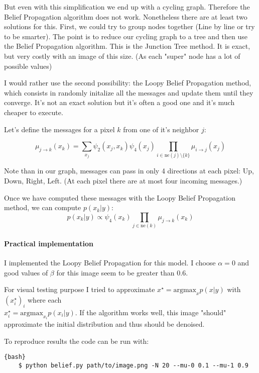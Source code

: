 \documentclass{article}
\begin{document}
But even with this simplification we end up with a cycling graph. Therefore the Belief Propagation algorithm does not work. Nonetheless there are at least
two solutions for this. First, we could try to group nodes together (Line by line or try to be smarter). The point is to reduce our cycling graph to a tree
and then use the Belief Propagation algorithm. This is the Junction Tree method. It is exact, but very costly with an image of this size. (As each
"super" node has a lot of possible values)

I would rather use the second possibility: the Loopy Belief Propagation method, which consists in randomly initalize all the messages and update them until
they converge.  It's not an exact solution but it's often a good one and it's much cheaper to execute.

Let's define the messages for a pixel $k$ from one of it's neighbor $j$:

\begin{equation*}
    \mu_{j \rightarrow k}(x_k) = \sum_{x_j} \psi_2(x_j, x_k) \psi_4(x_j) \prod_{i\in\text{ne}(j)\setminus\{k\}}\mu_{i \rightarrow j}(x_j)
\end{equation*}

Note than in our graph, messages can pass in only 4 directions at each pixel: Up, Down, Right, Left. (At each pixel there are at most four
incoming messages.)

Once we have computed these messages with the Loopy Belief Propagation method, we can compute $p(x_k|y)$:
\begin{equation*}
    p(x_k| y) \propto \psi_4(x_k) \prod_{j \in \text{ne}(k)} \mu_{j \rightarrow k}(x_k)
\end{equation*}

\paragraph*{Practical implementation}
I implemented the Loopy Belief Propagation for this model. I choose $\alpha = 0$ and good values of
$\beta$ for this image seem to be greater than $0.6$.

For visual testing purpose I tried to approximate $x^\star = \text{argmax}_x p(x|y)$ with $(x_i^\star)_i$
where each \\$x_i^\star = \text{argmax}_{x_i} p(x_i|y)$. If the algorithm works well, this image "should" approximate
the initial distribution and thus should be denoised.

To reproduce results the code can be run with:
\begin{lstlisting}{bash}
    $ python belief.py path/to/image.png -N 20 --mu-0 0.1 --mu-1 0.9
\end{lstlisting}
\end{document}

